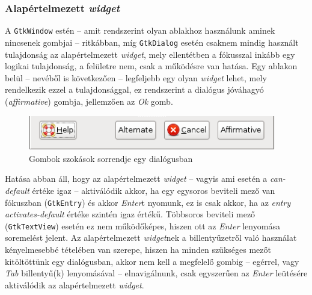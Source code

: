 \subsubsection{Alapértelmezett \textit{widget}}

A \texttt{GtkWindow} estén -- amit rendszerint olyan ablakhoz használunk aminek nincsenek gombjai -- ritkábban, míg \texttt{GtkDialog} esetén csaknem mindig használt tulajdonság az alapértelmezett \textit{widget}, mely ellentétben a fókusszal inkább egy logikai tulajdonság, a felületre nem, csak a működésre van hatása. Egy ablakon belül -- nevéből is következően -- legfeljebb egy olyan \textit{widget} lehet, mely rendelkezik ezzel a tulajdonsággal, ez rendszerint a dialógus jóváhagyó (\textit{affirmative}) gombja, jellemzően az \textit{Ok} gomb.

\begin{figure}[H]
\begin{center}
\includegraphics[height=15mm]{images/button-affirmative.png}
\caption{Gombok szokások sorrendje egy dialógusban}
\end{center}
\end{figure}

Hatása abban áll, hogy az alapértelmezett \textit{widget} -- vagyis ami esetén a \textit{can-default} értéke igaz -- aktiválódik akkor, ha egy egysoros beviteli mező van fókuszban (\texttt{GtkEntry}) és akkor \textit{Enter}t nyomunk, ez is csak akkor, ha az \textit{entry} \textit{activates-default} értéke szintén igaz értékű. Többsoros beviteli mező (\texttt{GtkTextView}) esetén ez nem működőképes, hiszen ott az \textit{Enter} lenyomása soremelést jelent. Az alapértelmezett \textit{widget}nek a billentyűzetről való használat kényelmesebbé tételében van szerepe, hiszen ha minden szükséges mezőt kitöltöttünk egy dialógusban, akkor nem kell a megfelelő gombig -- egérrel, vagy \textit{Tab} billentyű(k) lenyomásával -- elnavigálnunk, csak egyszerűen az \textit{Enter} leütésére aktiválódik az alapértelmezett \textit{widget}.

